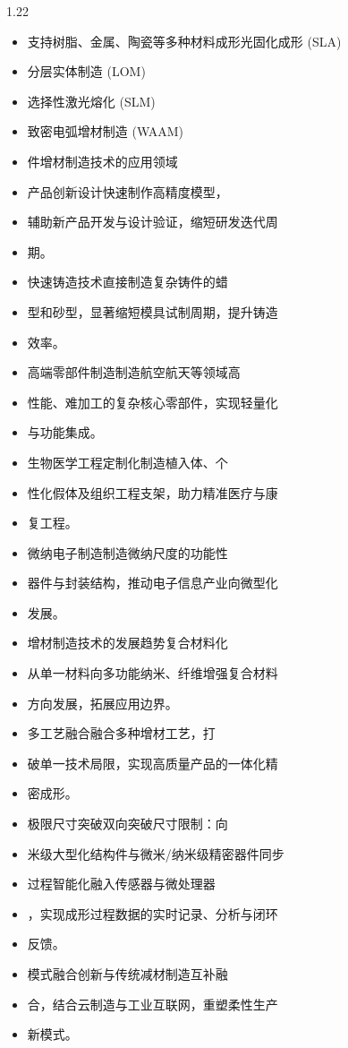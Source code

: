 \documentclass[12pt,a4paper]{article}
\begin{document}
\begin{spacing}{1.22}
\begin{itemize}[leftmargin=2.2em,label=--]
  \item 支持树脂、金属、陶瓷等多种材料成形光固化成形 (SLA)
  \item 分层实体制造 (LOM)
  \item 选择性激光熔化 (SLM)
  \item 致密电弧增材制造 (WAAM)
  \item 件增材制造技术的应用领域
  \item 产品创新设计快速制作高精度模型，
  \item 辅助新产品开发与设计验证，缩短研发迭代周
  \item 期。
  \item 快速铸造技术直接制造复杂铸件的蜡
  \item 型和砂型，显著缩短模具试制周期，提升铸造
  \item 效率。
  \item 高端零部件制造制造航空航天等领域高
  \item 性能、难加工的复杂核心零部件，实现轻量化
  \item 与功能集成。
  \item 生物医学工程定制化制造植入体、个
  \item 性化假体及组织工程支架，助力精准医疗与康
  \item 复工程。
  \item 微纳电子制造制造微纳尺度的功能性
  \item 器件与封装结构，推动电子信息产业向微型化
  \item 发展。
  \item 增材制造技术的发展趋势复合材料化
  \item 从单一材料向多功能纳米、纤维增强复合材料
  \item 方向发展，拓展应用边界。
  \item 多工艺融合融合多种增材工艺，打
  \item 破单一技术局限，实现高质量产品的一体化精
  \item 密成形。
  \item 极限尺寸突破双向突破尺寸限制：向
  \item 米级大型化结构件与微米/纳米级精密器件同步
  \item 过程智能化融入传感器与微处理器
  \item ，实现成形过程数据的实时记录、分析与闭环
  \item 反馈。
  \item 模式融合创新与传统减材制造互补融
  \item 合，结合云制造与工业互联网，重塑柔性生产
  \item 新模式。
\end{itemize}


\end{spacing}
\end{document}
